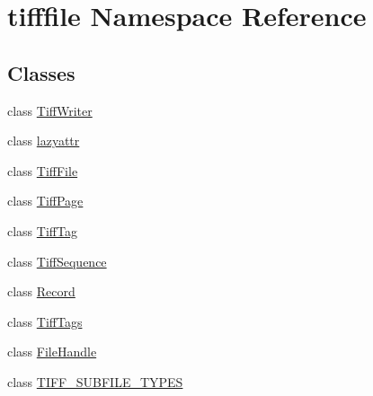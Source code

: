 \hypertarget{namespacetifffile}{\section{tifffile Namespace Reference}
\label{namespacetifffile}
}
\subsection*{Classes}
\begin{DoxyCompactItemize}
\item 
class \hyperlink{classtifffile_1_1_tiff_writer}{Tiff\-Writer}
\item 
class \hyperlink{classtifffile_1_1lazyattr}{lazyattr}
\item 
class \hyperlink{classtifffile_1_1_tiff_file}{Tiff\-File}
\item 
class \hyperlink{classtifffile_1_1_tiff_page}{Tiff\-Page}
\item 
class \hyperlink{classtifffile_1_1_tiff_tag}{Tiff\-Tag}
\item 
class \hyperlink{classtifffile_1_1_tiff_sequence}{Tiff\-Sequence}
\item 
class \hyperlink{classtifffile_1_1_record}{Record}
\item 
class \hyperlink{classtifffile_1_1_tiff_tags}{Tiff\-Tags}
\item 
class \hyperlink{classtifffile_1_1_file_handle}{File\-Handle}
\item 
class \hyperlink{classtifffile_1_1_t_i_f_f___s_u_b_f_i_l_e___t_y_p_e_s}{T\-I\-F\-F\-\_\-\-S\-U\-B\-F\-I\-L\-E\-\_\-\-T\-Y\-P\-E\-S}
\end{DoxyCompactItemize}
